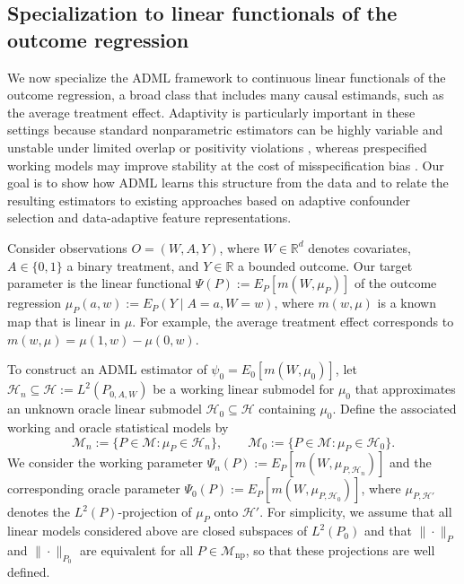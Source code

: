 \documentclass[11pt]{article}
\theoremstyle{definition}
\begin{document}
 
 
 

 \subsection{Specialization to linear functionals of the outcome regression}
\label{section::ADMLlinear}

We now specialize the ADML framework to continuous linear functionals of the outcome regression, a broad class that includes many causal estimands, such as the average treatment effect. Adaptivity is particularly important in these settings because standard nonparametric estimators can be highly variable and unstable under limited overlap or positivity violations \citep{petersen2012diagnosing, d2021overlap}, whereas prespecified working models may improve stability at the cost of misspecification bias \citep{imbensOverlapEstimand2006, li2019overlapWeights}. Our goal is to show how ADML learns this structure from the data and to relate the resulting estimators to existing approaches based on adaptive confounder selection and data-adaptive feature representations.

 


Consider observations \(O=(W,A,Y)\), where \(W \in \mathbb{R}^d\) denotes covariates, \(A \in \{0,1\}\) a binary treatment, and \(Y \in \mathbb{R}\) a bounded outcome. Our target parameter is the linear functional \(\Psi(P):=E_P[m(W,\mu_P)]\) of the outcome regression \(\mu_P(a,w):=E_P(Y \mid A=a,W=w)\), where \(m(w,\mu)\) is a known map that is linear in \(\mu\). For example, the average treatment effect corresponds to \(m(w,\mu)=\mu(1,w)-\mu(0,w)\).

To construct an ADML estimator of \(\psi_0 = E_0[m(W,\mu_0)]\), let \(\mathcal{H}_n \subseteq \mathcal{H} := L^2(P_{0,A,W})\) be a working linear submodel for \(\mu_0\) that approximates an unknown oracle linear submodel \(\mathcal{H}_0 \subseteq \mathcal{H}\) containing \(\mu_0\). Define the associated working and oracle statistical models by
\[
\mathcal{M}_n := \{P \in \mathcal{M} : \mu_P \in \mathcal{H}_n\}, \qquad
\mathcal{M}_0 := \{P \in \mathcal{M} : \mu_P \in \mathcal{H}_0\}.
\]
We consider the working parameter \(\Psi_n(P) := E_P[m(W,\mu_{P,\mathcal{H}_n})]\) and the corresponding oracle parameter \(\Psi_0(P) := E_P[m(W,\mu_{P,\mathcal{H}_0})]\), where \(\mu_{P,\mathcal{H}'}\) denotes the \(L^2(P)\)-projection of \(\mu_P\) onto \(\mathcal{H}'\). For simplicity, we assume that all linear models considered above are closed subspaces of \(L^2(P_0)\) and that \(\|\cdot\|_P\) and \(\|\cdot\|_{P_0}\) are equivalent for all \(P \in \mathcal{M}_{\mathrm{np}}\), so that these projections are well defined.
\end{document}

